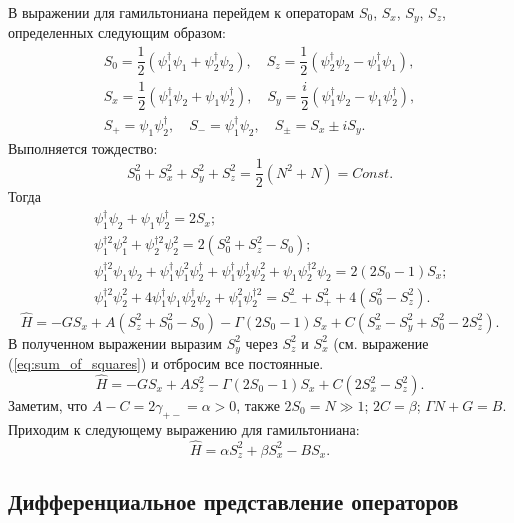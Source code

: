 \documentclass[12pt]{article}
\begin{document}
В выражении для гамильтониана перейдем к операторам $S_0$, $S_x$, $S_y$, $S_z$, определенных следующим образом:
%
\begin{equation}
\begin{array}{c}
	S_0 = \dfrac{1}{2} (\psi_1^\dag \psi_1 + \psi_2^\dag \psi_2), \quad S_z = \dfrac{1}{2} (\psi_2^\dag \psi_2 - \psi_1^\dag \psi_1), \\[10pt]
	S_x = \dfrac{1}{2} (\psi_1^\dag \psi_2 + \psi_1 \psi_2^\dag), \quad S_y = \dfrac{i}{2} (\psi_1^\dag \psi_2 - \psi_1 \psi_2^\dag), \\[10pt]
	S_+ = \psi_1 \psi_2^\dag, \quad S_- = \psi_1^\dag \psi_2, \quad S_{\pm} = S_x \pm iS_y.
\end{array}
\end{equation}
%
Выполняется тождество:
%
\begin{equation}
S_0^2 + S_x^2 + S_y^2 + S_z^2 = \dfrac{1}{2}(N^2 + N) = Const.
\label{eq:sum_of_squares}
\end{equation}
%
Тогда
%
\begin{eqnarray*}
&& \psi_1^\dag \psi_2 + \psi_1 \psi_2^\dag = 2S_x; \\
&& \psi_1^{\dag 2} \psi_1^2 + \psi_2^{\dag 2} \psi_2^2 = 2(S_0^2 + S_z^2 - S_0); \\
&& \psi_1^{\dag 2} \psi_1 \psi_2 + \psi_1^\dag \psi_1^2 \psi_2^\dag + \psi_1^\dag \psi_2^\dag \psi_2^2 + \psi_1 \psi_2^{\dag 2} \psi_2 = 2(2S_0 - 1) S_x; \\
&& \psi_1^{\dag 2} \psi_2^2 + 4 \psi_1^\dag \psi_1 \psi_2^\dag \psi_2 + \psi_1^2 \psi_2^{\dag 2} = S_-^2 + S_+^2 + 4(S_0^2 - S_z^2).
\end{eqnarray*}
%
%
$$\hat{H} = -G S_x + A(S_z^2 + S_0^2 - S_0) - \Gamma (2S_0 - 1) S_x + C(S_x^2 - S_y^2 + S_0^2 - 2S_z^2).$$
%
В полученном выражении выразим $S_y^2$ через $S_z^2$ и $S_x^2$ (см. выражение (\ref{eq:sum_of_squares}) и отбросим все постоянные.
%
$$\hat{H} = -G S_x + A S_z^2 - \Gamma (2S_0 - 1) S_x + C(2 S_x^2 - S_z^2).$$
%
Заметим, что $A - C = 2 \gamma_{+-} = \alpha > 0$, также $2S_0 = N \gg 1$; $2C = \beta$; $\Gamma N+G = B$.
Приходим к следующему выражению для гамильтониана:
%
\begin{equation}
\hat{H} = \alpha S_z^2 + \beta S_x^2 - B S_x.
\label{eq:spin_hamiltonian}
\end{equation}

\subsection*{Дифференциальное представление операторов}
\end{document}

